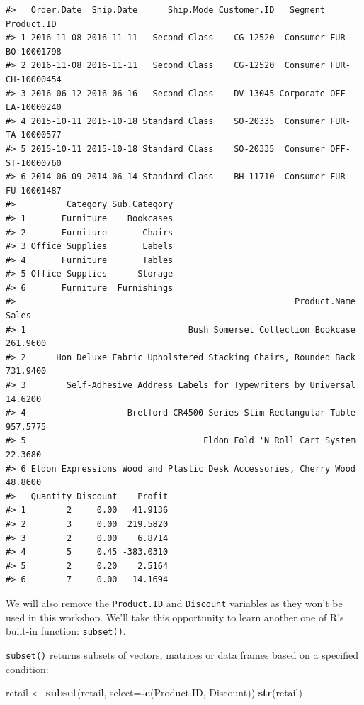 \documentclass[]{article}
\newenvironment{Shaded}{\begin{snugshade}}{\end{snugshade}}
\newcommand{\DataTypeTok}[1]{\textcolor[rgb]{0.13,0.29,0.53}{#1}}
\newcommand{\KeywordTok}[1]{\textcolor[rgb]{0.13,0.29,0.53}{\textbf{#1}}}
\newcommand{\NormalTok}[1]{#1}
\newcommand{\OperatorTok}[1]{\textcolor[rgb]{0.81,0.36,0.00}{\textbf{#1}}}
\newcommand{\StringTok}[1]{\textcolor[rgb]{0.31,0.60,0.02}{#1}}
\begin{document}
\begin{verbatim}
#>   Order.Date  Ship.Date      Ship.Mode Customer.ID   Segment      Product.ID
#> 1 2016-11-08 2016-11-11   Second Class    CG-12520  Consumer FUR-BO-10001798
#> 2 2016-11-08 2016-11-11   Second Class    CG-12520  Consumer FUR-CH-10000454
#> 3 2016-06-12 2016-06-16   Second Class    DV-13045 Corporate OFF-LA-10000240
#> 4 2015-10-11 2015-10-18 Standard Class    SO-20335  Consumer FUR-TA-10000577
#> 5 2015-10-11 2015-10-18 Standard Class    SO-20335  Consumer OFF-ST-10000760
#> 6 2014-06-09 2014-06-14 Standard Class    BH-11710  Consumer FUR-FU-10001487
#>          Category Sub.Category
#> 1       Furniture    Bookcases
#> 2       Furniture       Chairs
#> 3 Office Supplies       Labels
#> 4       Furniture       Tables
#> 5 Office Supplies      Storage
#> 6       Furniture  Furnishings
#>                                                       Product.Name    Sales
#> 1                                Bush Somerset Collection Bookcase 261.9600
#> 2      Hon Deluxe Fabric Upholstered Stacking Chairs, Rounded Back 731.9400
#> 3        Self-Adhesive Address Labels for Typewriters by Universal  14.6200
#> 4                    Bretford CR4500 Series Slim Rectangular Table 957.5775
#> 5                                   Eldon Fold 'N Roll Cart System  22.3680
#> 6 Eldon Expressions Wood and Plastic Desk Accessories, Cherry Wood  48.8600
#>   Quantity Discount    Profit
#> 1        2     0.00   41.9136
#> 2        3     0.00  219.5820
#> 3        2     0.00    6.8714
#> 4        5     0.45 -383.0310
#> 5        2     0.20    2.5164
#> 6        7     0.00   14.1694
\end{verbatim}

We will also remove the \texttt{Product.ID} and \texttt{Discount}
variables as they won't be used in this workshop. We'll take this
opportunity to learn another one of R's built-in function:
\texttt{subset()}.

\texttt{subset()} returns subsets of vectors, matrices or data frames
based on a specified condition:

\begin{Shaded}
\begin{Highlighting}[]
\NormalTok{retail <-}\StringTok{ }\KeywordTok{subset}\NormalTok{(retail, }\DataTypeTok{select=}\OperatorTok{-}\KeywordTok{c}\NormalTok{(Product.ID, Discount))}
\KeywordTok{str}\NormalTok{(retail)}
\end{Highlighting}
\end{Shaded}
\end{document}
